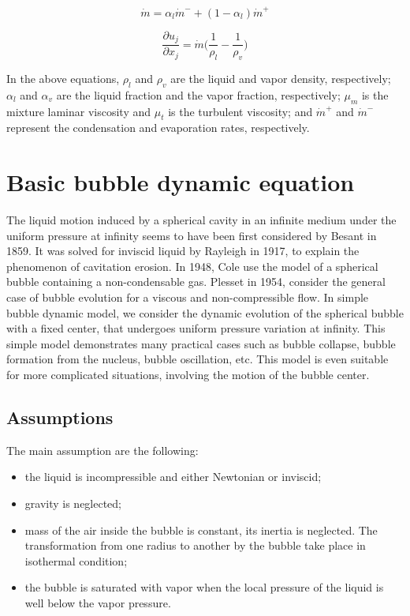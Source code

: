\begin{equation}
\dot{m}={{\alpha}_l}\dot{m}^{-} + (1-{{\alpha}_l})\dot{m}^{+}
\end{equation}

\begin{equation}
\frac{\partial{{u_j}}}{\partial{x_j}}=\dot{m}\Bigg(\frac{1}{{\rho}_l}-\frac{1}{{\rho}_v}\Bigg)
\end{equation}

In the above equations, ${\rho}_l$ and ${\rho}_v$ are the liquid and
vapor density, respectively; ${\alpha}_l$ and ${\alpha}_v$ are the
liquid fraction and the vapor fraction, respectively; ${\mu}_m$ is the
mixture laminar viscosity and ${\mu}_t$ is the turbulent viscosity;
and $\dot{m}^+$ and $\dot{m}^-$ represent the condensation and
evaporation rates, respectively.

\section{Basic bubble dynamic equation}
The liquid motion induced by a spherical cavity in an infinite
medium under the uniform pressure at infinity seems to have been first
considered by Besant in 1859.  It was solved for inviscid liquid by
Rayleigh in 1917, to explain the phenomenon of cavitation erosion. In
1948, Cole use the model of a spherical bubble containing a
non-condensable gas. Plesset in 1954, consider the general case of
bubble evolution for a viscous and non-compressible flow.
In simple bubble dynamic model\cite{FundamentalsofCavitation.2004}, we consider
the dynamic evolution of the spherical bubble with a fixed center,
that undergoes uniform pressure variation at infinity. This simple
model demonstrates many practical cases such as bubble collapse,
bubble formation from the nucleus, bubble oscillation, etc. This
model is even suitable for more complicated situations, involving the
motion of the bubble center. 

\subsection{Assumptions}
The main assumption are the following:
\begin{itemize}
\item the liquid is incompressible and either Newtonian or inviscid;
\item gravity is neglected;
\item mass of the air inside the bubble is constant, its inertia is
  neglected. The transformation from one radius to another by the
  bubble take place in isothermal condition;
\item the bubble is saturated with vapor when the local pressure of
  the liquid is well below the vapor pressure.
\end{itemize}

